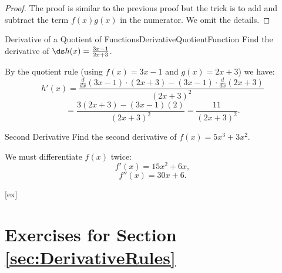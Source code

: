 \begin{proof}
The proof is similar to the previous proof but the trick is to add and subtract the term $f(x)g(x)$ in the numerator.
We omit the details.
\end{proof}

\begin{example}{Derivative of a Quotient of Functions}{DerivativeQuotientFunction}
Find the derivative of $\ds h(x)=\frac{3x-1}{2x+3}$.
\end{example}

\begin{solution} 
By the quotient rule (using $f(x)=3x-1$ and $g(x)=2x+3$) we have:
$$h'(x)=\frac{\frac{d}{dx}(3x-1)\cdot (2x+3)-(3x-1)\cdot\frac{d}{dx}(2x+3)}{(2x+3)^2}$$
$$=\frac{3(2x+3)-(3x-1)(2)}{(2x+3)^2}=\frac{11}{(2x+3)^2}.$$
\end{solution}

\begin{example}{Second Derivative}{}
Find the second derivative of $f(x)=5x^3+3x^2$.
\end{example}

\begin{solution} 
We must differentiate $f(x)$ twice:
$$f'(x)=15x^2+6x,$$
$$f''(x)=30x+6.$$
\end{solution}


[ex]
\section*{Exercises for Section \ref{sec:DerivativeRules}}

